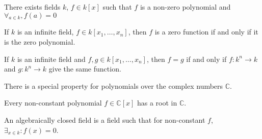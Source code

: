 \documentclass[crop=false,class=article,oneside]{standalone}
\begin{document}
    \begin{theorem}
    There exists fields $k$, $f\in k[x]$ such that $f$ is a non-zero polynomial and $\forall_{a\in k},f(a)=0$
    \end{theorem}
    \begin{theorem}
    If $k$ is an infinite field, $f\in k[x_1,\hdots ,x_n]$, then $f$ is a zero function if and only if it is the zero polynomial.
    \end{theorem}
    \begin{theorem}
    If $k$ is an infinite field and $f,g\in k[x_1,\hdots ,x_n]$, then $f=g$ if and only if $f:k^n\rightarrow k$ and $g:k^n \rightarrow k$ give the same function.
    \end{theorem}
    There is a special property for polynomials over the complex numbers $\mathbb{C}$.
    \begin{theorem}
    Every non-constant polynomial $f\in \mathbb{C}[x]$ has a root in $\mathbb{C}$.
    \end{theorem}
    \begin{definition}
    An algebraically closed field is a field such that for non-constant $f$, $\exists_{x\in k}:f(x)=0$.
    \end{definition}
\end{document}
